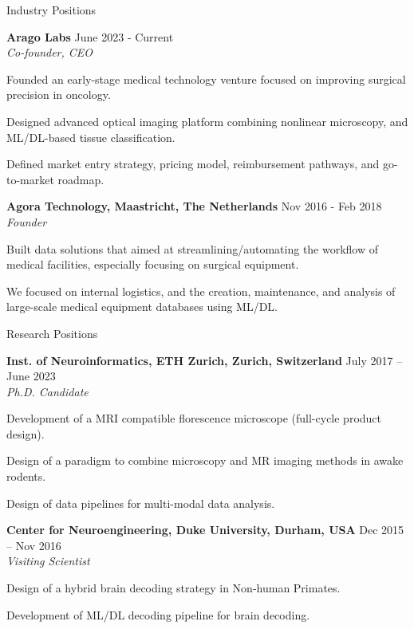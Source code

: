 \documentclass{resume}
\begin{document}
\begin{sections}{Industry Positions}

{\bf Arago Labs} \hfill {June 2023 - Current} 
\\{\textit{Co-founder, CEO}}
\begin{resumeitemize}
\item Founded an early-stage medical technology venture focused on improving surgical precision in oncology.
\item Designed advanced optical imaging platform combining nonlinear microscopy, and ML/DL-based tissue classification.
\item Defined market entry strategy, pricing model, reimbursement pathways, and go-to-market roadmap.
\end{resumeitemize}

{\bf Agora Technology, Maastricht, The Netherlands} \hfill {Nov 2016 - Feb 2018} 
\\{\textit{Founder}}
\begin{resumeitemize}
\item Built data solutions that aimed at streamlining/automating the workflow of medical facilities, especially focusing on surgical equipment.
\item We focused on internal logistics, and the creation, maintenance, and analysis of large-scale medical equipment databases using ML/DL.
\end{resumeitemize}

\end{sections}

\newpage

\begin{sections}{Research Positions}

{\bf Inst. of Neuroinformatics, ETH Zurich, Zurich, Switzerland} \hfill {July 2017 – June 2023} 
\\{\textit{Ph.D. Candidate}}
\begin{resumeitemize}
\item Development of a MRI compatible florescence microscope (full-cycle product design).
\item Design of a paradigm to combine microscopy and MR imaging methods in awake rodents.
\item Design of data pipelines for multi-modal data analysis.
\end{resumeitemize}

{\bf Center for Neuroengineering, Duke University, Durham, USA} \hfill {Dec 2015 – Nov 2016} 
\\{\textit{Visiting Scientist}}
\begin{resumeitemize}
\item Design of a hybrid brain decoding strategy in Non-human Primates.
\item Development of ML/DL decoding pipeline for brain decoding.
\end{resumeitemize}

\end{sections}
\end{document}
